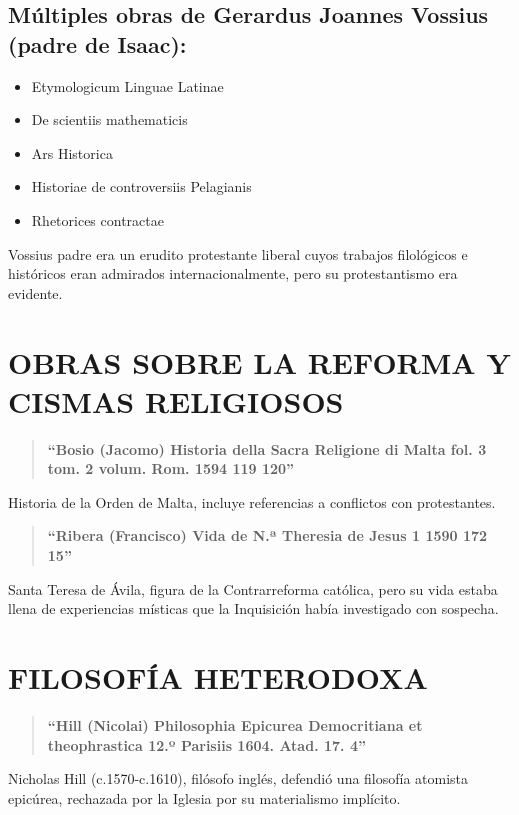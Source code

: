\documentclass[12pt,a4paper]{article}
\begin{document}
\subsection*{Múltiples obras de Gerardus Joannes Vossius (padre de Isaac):}
\begin{itemize}
    \item Etymologicum Linguae Latinae
    \item De scientiis mathematicis
    \item Ars Historica
    \item Historiae de controversiis Pelagianis
    \item Rhetorices contractae
\end{itemize}

Vossius padre era un erudito protestante liberal cuyos trabajos filológicos e históricos eran admirados internacionalmente, pero su protestantismo era evidente.

\section{OBRAS SOBRE LA REFORMA Y CISMAS RELIGIOSOS}

\begin{quote}
\textbf{``Bosio (Jacomo) Historia della Sacra Religione di Malta fol. 3 tom. 2 volum. Rom. 1594 119 120''}
\end{quote}

Historia de la Orden de Malta, incluye referencias a conflictos con protestantes.

\begin{quote}
\textbf{``Ribera (Francisco) Vida de N.ª Theresia de Jesus 1 1590 172 15''}
\end{quote}

Santa Teresa de Ávila, figura de la Contrarreforma católica, pero su vida estaba llena de experiencias místicas que la Inquisición había investigado con sospecha.

\section{FILOSOFÍA HETERODOXA}

\begin{quote}
\textbf{``Hill (Nicolai) Philosophia Epicurea Democritiana et theophrastica 12.º Parisiis 1604. Atad. 17. 4''}
\end{quote}

Nicholas Hill (c.1570-c.1610), filósofo inglés, defendió una filosofía atomista epicúrea, rechazada por la Iglesia por su materialismo implícito.
\end{document}
